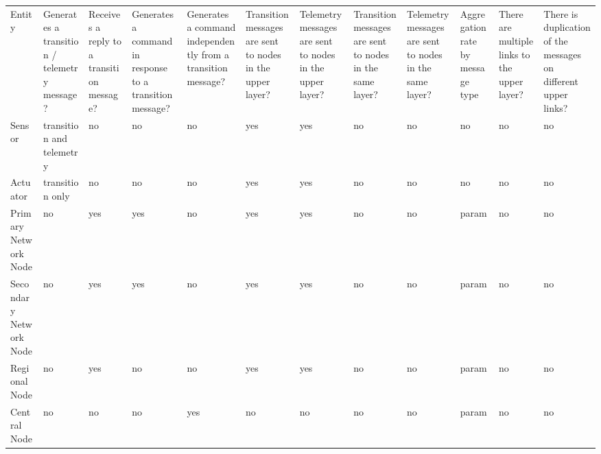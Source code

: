 \documentclass[a4paper,10pt]{article}
\begin{document}
	\begin{landscape}
		\begin{table}[]
			\begin{tabular}{@{}llllllllllll@{}}
				Entity & Generates a transition / telemetry message? & Receives a reply to a transition message? & Generates a command in response to a transition message? & Generates a command independently from a transition message? & Transition messages are sent to nodes in the upper layer? & Telemetry messages are sent to nodes in the upper layer? & Transition messages are sent to nodes in the same layer? & Telemetry messages are sent to nodes in the same layer? & Aggregation rate by message type & There are multiple links to the upper layer? & There is duplication of the messages on different upper links? \\
				Sensor & transition and telemetry & {\color[HTML]{00FF00} no} & no & no & yes & yes & no & no & no & no & {\color[HTML]{00FF00} no} \\
				Actuator & transition only & {\color[HTML]{00FF00} no} & no & no & yes & yes & no & no & no & no & {\color[HTML]{00FF00} no} \\
				Primary Network Node & no & {\color[HTML]{00FF00} yes} & {\color[HTML]{00FF00} yes} & {\color[HTML]{00FF00} no} & {\color[HTML]{00FF00} yes} & {\color[HTML]{00FF00} yes} & {\color[HTML]{00FF00} no} & {\color[HTML]{00FF00} no} & {\color[HTML]{00FF00} param} & no & {\color[HTML]{00FF00} no} \\
				Secondary Network Node & no & {\color[HTML]{00FF00} yes} & {\color[HTML]{00FF00} yes} & {\color[HTML]{00FF00} no} & {\color[HTML]{00FF00} yes} & {\color[HTML]{00FF00} yes} & {\color[HTML]{00FF00} no} & {\color[HTML]{00FF00} no} & {\color[HTML]{00FF00} param} & no & {\color[HTML]{00FF00} no} \\
				Regional Node & no & {\color[HTML]{00FF00} yes} & {\color[HTML]{00FF00} no} & {\color[HTML]{00FF00} no} & {\color[HTML]{00FF00} yes} & {\color[HTML]{00FF00} yes} & {\color[HTML]{00FF00} no} & {\color[HTML]{00FF00} no} & {\color[HTML]{00FF00} param} & no & {\color[HTML]{00FF00} no} \\
				Central Node & no & no & {\color[HTML]{00FF00} no} & {\color[HTML]{00FF00} yes} & no & no & {\color[HTML]{00FF00} no} & {\color[HTML]{00FF00} no} & {\color[HTML]{00FF00} param} & no & {\color[HTML]{00FF00} no}
			\end{tabular}
		\end{table}
	\end{landscape}
\end{document}
